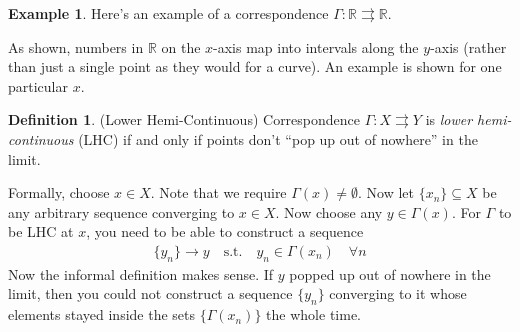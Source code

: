 \documentclass[12pt]{article}
\numberwithin{equation}{section} %
\theoremstyle{plain}
\theoremstyle{definition}
\newtheorem{defn}[thm]{Definition}
\newtheorem{ex}[thm]{Example}
\theoremstyle{remark}
\newcommand{\R}{\mathbb{R}}
\begin{document}
\begin{ex}
Here's an example of a correspondence $\Gamma: \R\rightrightarrows\R$.
\begin{figure}[htpb!]
\centering
{}
\end{figure}

As shown, numbers in $\R$ on the $x$-axis map into intervals along the
$y$-axis (rather than just a single point as they would for a curve).
An example is shown for one particular $x$.
\end{ex}

\begin{defn}{(Lower Hemi-Continuous)}
Correspondence $\Gamma:X\rightrightarrows Y$ is \emph{lower
hemi-continuous} (LHC) if and only if points don't ``pop up out of
nowhere'' in the limit.

Formally, choose $x\in X$. Note that we require
$\Gamma(x)\neq\emptyset$. Now let $\{x_n\}\subseteq X$ be any arbitrary
sequence converging to $x\in X$. Now choose any $y\in\Gamma(x)$.  For
$\Gamma$ to be LHC at $x$, you need to be able to construct a sequence
\begin{align*}
  \{y_n\}\rightarrow y
  \quad\text{s.t.}\quad
  y_n \in \Gamma(x_n) \quad\forall n
\end{align*}
Now the informal definition makes sense. If $y$ popped up out of
nowhere in the limit, then you could not construct a sequence $\{y_n\}$
converging to it whose elements stayed inside the sets
$\{\Gamma({x_n})\}$ the whole time.
\end{defn}
\end{document}
